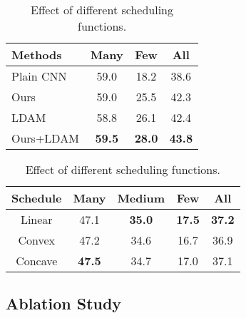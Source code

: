 \documentclass[runningheads]{llncs}
\begin{document}
	
	\begin{table}


















		\begin{minipage}[t]{0.50\linewidth}
			\centering
			\caption{Results on CIFAR100-LT.}
			\label{table:CIFAR}
\begin{tabular}{l|c|c|c}
				\hline
				Methods &  Many & Few & All  \\
				\hline\hline
				Plain CNN & 59.0 & 18.2 & 38.6 \\
				Ours & 59.0 & 25.5 & 42.3  \\
				LDAM \cite{cao2019learning} & 58.8 & 26.1 & 42.4 \\
				Ours+LDAM & \textbf{59.5} & \textbf{28.0} & \textbf{43.8} \\
				\hline
			\end{tabular}
			
















		\end{minipage}
		\begin{minipage}[t]{0.50\linewidth}  
			\centering
			\caption{Effect of different scheduling functions.}
			\label{table:scheduleType}
\begin{tabular}{c|c|c|c|c}
				\hline
				Schedule &  Many & Medium & Few & All  \\
				\hline\hline
				Linear & 47.1 & \textbf{35.0} & \textbf{17.5} & \textbf{37.2} \\
				Convex & 47.2 & 34.6 & 16.7 & 36.9 \\
				Concave & \textbf{47.5} & 34.7 & 17.0 & 37.1 \\
				\hline
				
			\end{tabular}


		\end{minipage}
	\end{table}
	
	\subsection{Ablation Study}
	
\end{document}
